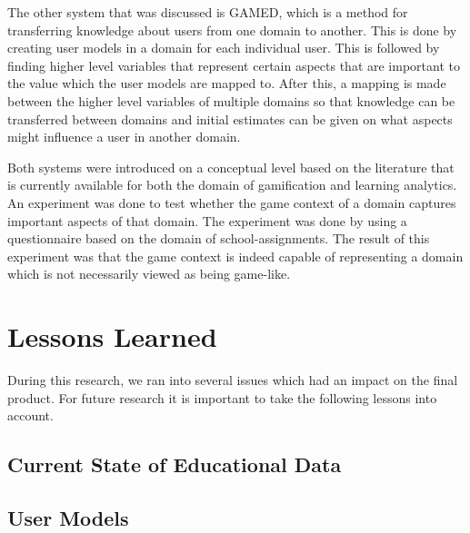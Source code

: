 \documentclass[11pt]{article}
\begin{document}
The other system that was discussed is GAMED, which is a method for transferring knowledge about users from one domain to another. This is done by creating user models in a domain for each individual user. This is followed by finding higher level variables that represent certain aspects that are important to the value which the user models are mapped to. After this, a mapping is made between the higher level variables of multiple domains so that knowledge can be transferred between domains and initial estimates can be given on what aspects might influence a user in another domain.

Both systems were introduced on a conceptual level based on the literature that is currently available for both the domain of gamification and learning analytics. An experiment was done to test whether the game context of a domain captures important aspects of that domain. The experiment was done by using a questionnaire based on the domain of school-assignments. The result of this experiment was that the game context is indeed capable of representing a domain which is not necessarily viewed as being game-like. 


\section{Lessons Learned}\label{sec:discussion}
During this research, we ran into several issues which had an impact on the final product. For future research it is important to take the following lessons into account.

\subsection{Current State of Educational Data}

\subsection{User Models}
\end{document}
